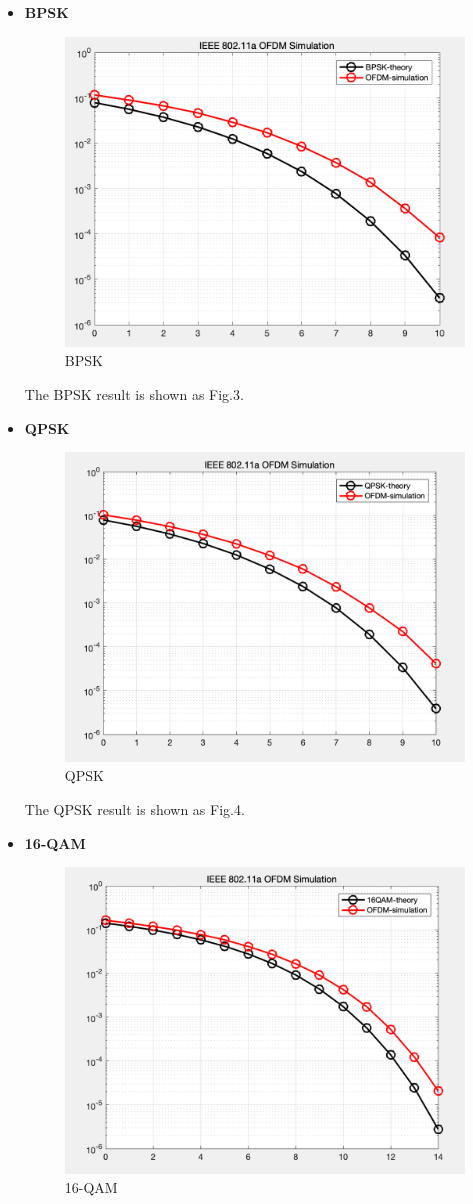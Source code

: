 \documentclass{article}
\begin{document}
\begin{itemize}
	\item \textbf{BPSK}
	
	\begin{figure}[!h]
		\centering
		\includegraphics[width=0.7\linewidth]{B}
		\caption{BPSK}
		\label{fig:b}
	\end{figure}
	
	The BPSK result is shown as Fig.3. 
	\item  
	\textbf{QPSK}
	
	\begin{figure}[!h]
		\centering
		\includegraphics[width=0.7\linewidth]{Q}
		\caption{QPSK}
		\label{fig:q}
	\end{figure}
	The QPSK result is shown as Fig.4. 
	
	\item 
	\textbf{16-QAM}
	
	\begin{figure}[!h]
		\centering
		\includegraphics[width=0.7\linewidth]{16}
		\caption{16-QAM}
		\label{fig:16}
	\end{figure}
	

\end{itemize}
\end{document}
